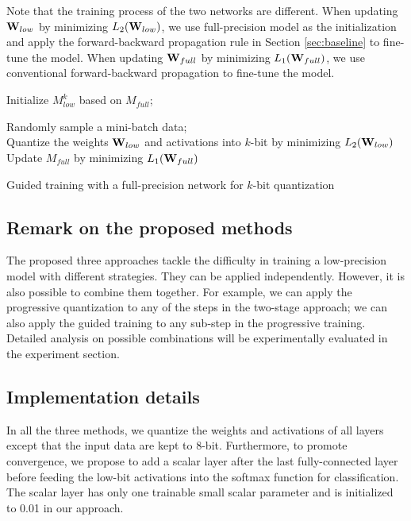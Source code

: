 \documentclass[10pt,twocolumn,letterpaper]{article}
\begin{document}
Note that the training process of the two networks are different.
When updating ${{\bf{W}}_{low}}$ by minimizing $L_2({{\bf{W}}_{low}})$, we use full-precision model as the initialization and apply the forward-backward propagation rule in Section \ref{sec:baseline}  to fine-tune the model. When updating ${{\bf{W}}_{full}}$ by minimizing $L_1({{\bf{W}}_{full}})$, we use conventional forward-backward propagation to fine-tune the model.


\begin{algorithm}[]
	Initialize $M_{low}^k$ based on $M_{full}$;\\
	{
		{
			Randomly sample a mini-batch data;\\
			Quantize the weights ${{\bf{W}}_{low}}$  and activations into $k$-bit by minimizing $L_2({{\bf{W}}_{low}})$\;
			Update $M_{full}$ by minimizing $L_1({{\bf{W}}_{full}})$\;
		}

	}
	\caption{Guided training with a full-precision network for $k$-bit quantization}
	\label{algo:one-mutual learning}
\end{algorithm}


%
%
%
%
%
%
%
%
%
%

\subsection{Remark on the proposed methods}
The proposed three approaches tackle the difficulty in training a low-precision model with different strategies. They can be applied independently. However, it is also possible to combine them together. For example, we can apply the progressive quantization to any of the steps in the two-stage approach; we can also apply the guided training to any sub-step in the progressive training. Detailed analysis on possible combinations will be experimentally evaluated in the experiment section.


\subsection{Implementation details} \label{sec:implementation}

In all the three methods, we quantize the weights and activations of all layers except that the input data are kept to 8-bit. Furthermore, to promote convergence, we propose to add a scalar layer after the last fully-connected layer before feeding the low-bit activations into the softmax function for classification. The scalar layer has only one trainable small scalar parameter and is initialized to 0.01 in our approach.
\end{document}

